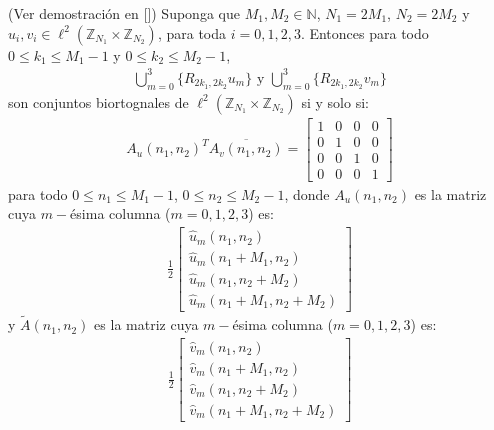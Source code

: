 \begin{theorem}
(Ver demostraci\'on en [\textcolor{cyan}{\cite{12}}]) Suponga que $M_1,M_2\in\mathbb{N}$, $N_1=2M_1$, $N_2=2M_2$ y $u_i,v_i\in\ell^2(\mathbb{Z}_{N_1}\times\mathbb{Z}_{N_2})$, para toda $i=0,1,2,3$. Entonces para todo $0\leq k_1 \leq M_1-1$ y $0\leq k_2 \leq M_2-1$,
\begin{eqnarray}
\bigcup_{m=0}^{3}\{R_{2k_1,2k_2}u_m\}\mbox{ y }\bigcup_{m=0}^{3}\{R_{2k_1,2k_2}v_m\}\nonumber
\end{eqnarray}
son conjuntos biortognales de $\ell^2(\mathbb{Z}_{N_1}\times\mathbb{Z}_{N_2})$ si y solo si:
\begin{eqnarray}
A_u(n_1,n_2)^T\overline{A_v(n_1,n_2)}=\left[\begin{array}{cccc}
1&0&0&0\\0&1&0&0\\0&0&1&0\\0&0&0&1
\end{array}\right]\nonumber
\end{eqnarray}
para todo $0\leq n_1 \leq M_1-1$, $0\leq n_2 \leq M_2-1$, donde $A_u(n_1,n_2)$ es la matriz cuya $m-$\'esima columna ($m=0,1,2,3$) es:
\begin{eqnarray}
\frac{1}{2}\left[\begin{array}{c}
\hat{u}_m(n_1,n_2)\\
\hat{u}_m(n_1+M_1,n_2)\\
\hat{u}_m(n_1,n_2+M_2)\\
\hat{u}_m(n_1+M_1,n_2+M_2)
\end{array}\right]\nonumber
\end{eqnarray}
y $\tilde{A}(n_1,n_2)$ es la matriz cuya $m-$\'esima columna ($m=0,1,2,3$) es:
\begin{eqnarray}
\frac{1}{2}\left[\begin{array}{c}
\hat{v}_m(n_1,n_2)\\
\hat{v}_m(n_1+M_1,n_2)\\
\hat{v}_m(n_1,n_2+M_2)\\
\hat{v}_m(n_1+M_1,n_2+M_2)
\end{array}\right]\nonumber
\end{eqnarray}
\label{biortogonalidad}
\end{theorem}

